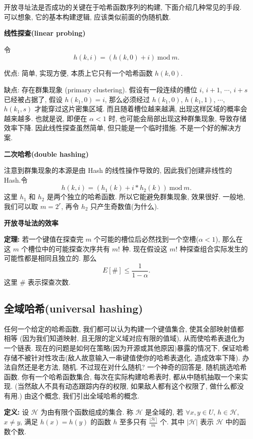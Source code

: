 \documentclass[a4paper]{ctexart}
\theoremstyle{definition}
\theoremstyle{definition}
\begin{document}
开放寻址法是否成功的关键在于哈希函数序列的构建, 下面介绍几种常见的手段. 可以想象, 它的基本构建逻辑, 
应该类似前面的伪随机数.

{\bf 线性探查(linear probing)}

令
$$
h(k, i) = (h(k, 0) + i) ~ \mathrm{mod} ~ m.
$$

优点: 简单, 实现方便, 本质上它只有一个哈希函数 $h(k, 0)$. 

缺点: 存在群集现象 (primary clustering). 假设有一段连续的槽位 $i$, $i
+ 1$, $\cdots$, $i + s$ 已经被占据了, 假设 $h(k_1, 0) = i$, 那么必须经过 
$h(k_1, 0)$, $h(k_1, 1)$, $\cdots$, $h(k_1, s)$ 才能穿过这片密集区域. 
而且随着槽位越来越满, 出现这样区域的概率会越来越多. 也就是说, 即便在 $\alpha < 1$ 时, 
也可能会局部出现这种群集现象, 导致存储效率下降. 因此线性探查虽然简单, 但只能是一个临时措施. 
不是一个好的解决方案.

{\bf 二次哈希(double hashing)}

注意到群集现象的本源是由 Hash 的线性操作导致的, 因此我们创建非线性的 Hash.令
$$
h(k, i) = (h_1(k) + i * h_2(k))~\mathrm{mod}~m.
$$
这里 $h_1$ 和 $h_2$ 是两个独立的哈希函数. 所以它能避免群集现象, 效果很好. 
一般地, 我们可以取 $m = 2^r$, 再令 $h_2$ 只产生奇数值(为什么).

{\bf 开放寻址法的效率}

{\bf 定理:} 若一个键值在探查完 $m$ 个可能的槽位后必然找到一个空槽($\alpha < 1$), 
那么在这 $m$ 个槽位中的可能探查次序共有 $m!$ 种. 现在假设这 $m!$ 
种探查组合实际发生的可能性都是相同且独立的. 那么
$$
E[\#] \leq \frac{1}{1 - \alpha}.
$$
这里 $\#$ 表示探查次数. 

\subsection{全域哈希(universal hashing)}

任何一个给定的哈希函数, 我们都可以认为构建一个键值集合, 使其全部映射值都相等
(因为我们知道映射, 且无限的定义域对应有限的值域), 从而使哈希表退化为一个链表. 
现在的问题是如何在策略(因为开源或其他原因)暴露的情况下, 
保证哈希存储不被针对性攻击(敌人故意输入一串键值使你的哈希表退化, 造成效率下降). 
办法自然还是老方法, 随机. 不过现在对什么随机? 一个神奇的回答是, 随机挑选哈希函数. 
你有一个哈希函数集合, 每次在实际构建哈希表时, 都从中随机抽取一个来实现.
(当然敌人不具有动态跟踪内存的权限, 如果敌人都有这个权限了, 做什么都没有用.)
由这个概念, 我们引出全域哈希的概念.

{\bf 定义:} 设 $\mathscr{H}$ 为由有限个函数组成的集合. 称 $\mathscr{H}$ 是全域的, 
若 $\forall x, y \in U$, $h \in \mathscr{H}$, $x \neq y$, 满足 $h(x) = h(y)$ 
的函数 $h$ 至多只有 $\frac{|\mathscr{H}|}{m}$ 个. 其中
$|\mathscr{H}|$ 表示 $\mathscr{H}$ 中的函数个数. 
\end{document}

